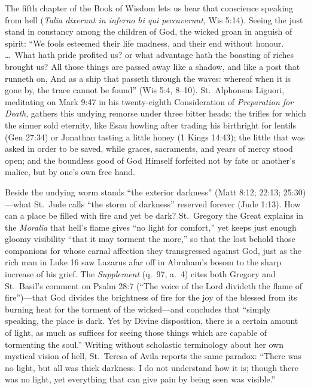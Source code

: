 The fifth chapter of the Book of Wisdom lets us hear that conscience speaking from hell (\textit{Talia dixerunt in inferno hi qui peccaverunt}, Wis 5:14). Seeing the just stand in constancy among the children of God, the wicked groan in anguish of spirit: ``We fools esteemed their life madness, and their end without honour. \dots\ What hath pride profited us? or what advantage hath the boasting of riches brought us? All those things are passed away like a shadow, and like a post that runneth on, And as a ship that passeth through the waves: whereof when it is gone by, the trace cannot be found'' (Wis 5:4, 8--10). St.\ Alphonsus Liguori, meditating on Mark 9:47 in his twenty-eighth Consideration of \textit{Preparation for Death}, gathers this undying remorse under three bitter heads: the trifles for which the sinner sold eternity, like Esau howling after trading his birthright for lentils (Gen 27:34) or Jonathan tasting a little honey (1 Kings 14:43); the little that was asked in order to be saved, while graces, sacraments, and years of mercy stood open; and the boundless good of God Himself forfeited not by fate or another's malice, but by one's own free hand.

Beside the undying worm stands ``the exterior darkness'' (Matt 8:12; 22:13; 25:30)---what St.\ Jude calls ``the storm of darkness'' reserved forever (Jude 1:13). How can a place be filled with fire and yet be dark? St.\ Gregory the Great explains in the \textit{Moralia} that hell's flame gives ``no light for comfort,'' yet keeps just enough gloomy visibility ``that it may torment the more,'' so that the lost behold those companions for whose carnal affection they transgressed against God, just as the rich man in Luke 16 saw Lazarus afar off in Abraham's bosom to the sharp increase of his grief. The \textit{Supplement} (q.\ 97, a.\ 4) cites both Gregory and St.\ Basil's comment on Psalm 28:7 (``The voice of the Lord divideth the flame of fire'')---that God divides the brightness of fire for the joy of the blessed from its burning heat for the torment of the wicked---and concludes that ``simply speaking, the place is dark. Yet by Divine disposition, there is a certain amount of light, as much as suffices for seeing those things which are capable of tormenting the soul.'' Writing without scholastic terminology about her own mystical vision of hell, St.\ Teresa of Avila reports the same paradox: ``There was no light, but all was thick darkness. I do not understand how it is; though there was no light, yet everything that can give pain by being seen was visible.''

